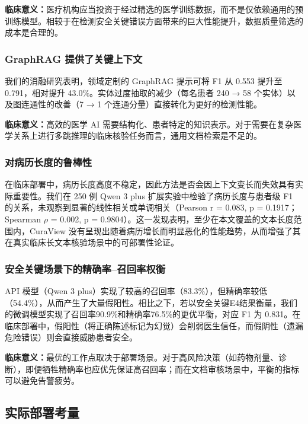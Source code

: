 \documentclass[11pt]{article}
\begin{document}
\textbf{临床意义：}医疗机构应当投资于经过精选的医学训练数据，而不是仅依赖通用的预训练模型。相较于在检测安全关键错误方面带来的巨大性能提升，数据质量筛选的成本是合理的。

\subsubsection{GraphRAG 提供了关键上下文}

我们的消融研究表明，领域定制的 GraphRAG 提示可将 F1 从 0.553 提升至 0.791，相对提升 43.0\%。实体过度抽取的减少（每名患者 240 → 58 个实体）以及图连通性的改善（7 → 1 个连通分量）直接转化为更好的检测性能。

\textbf{临床意义：}高效的医学 AI 需要结构化、患者特定的知识表示。对于需要在复杂医学关系上进行多跳推理的临床核验任务而言，通用文档检索是不足的。

\subsubsection{对病历长度的鲁棒性}

在临床部署中，病历长度高度不稳定，因此方法是否会因上下文变长而失效具有实际重要性。我们在 250 例 Qwen 3 plus 扩展实验中检验了病历长度与患者级 F1 的关系，未观察到显著的线性相关或单调相关（Pearson r = 0.083, p = 0.1917；Spearman \(\rho\) = 0.002, p = 0.9804）。这一发现表明，至少在本文覆盖的文本长度范围内，CuraView 没有呈现出随着病历增长而明显恶化的性能趋势，从而增强了其在真实临床长文本核验场景中的可部署性论证。

\subsubsection{安全关键场景下的精确率--召回率权衡}

API 模型（Qwen 3 plus）实现了较高的召回率（83.3\%），但精确率较低（54.4\%），从而产生了大量假阳性。相比之下，若以安全关键E4结果衡量，我们的微调模型实现了召回率90.9\%和精确率76.5\%的更优平衡，对应 F1 为 0.831。在临床部署中，假阳性（将正确陈述标记为幻觉）会削弱医生信任，而假阴性（遗漏危险错误）则会直接威胁患者安全。

\textbf{临床意义：}最优的工作点取决于部署场景。对于高风险决策（如药物剂量、诊断），即便牺牲精确率也应优先保证高召回率；而在文档审核场景中，平衡的指标可以避免告警疲劳。

\subsection{实际部署考量}
\end{document}
